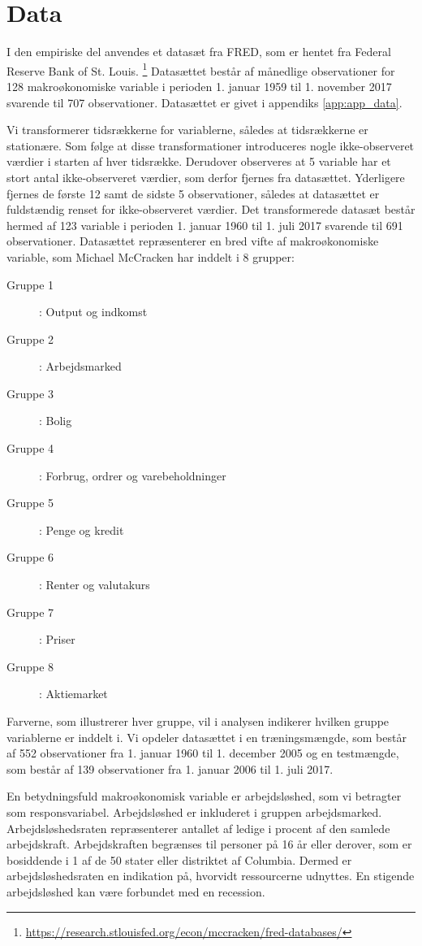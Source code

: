 \chapter{Data} \label{ch:data}
I den empiriske del anvendes et datasæt fra FRED, som er hentet fra Federal Reserve Bank of St. Louis. \footnote{\url{https://research.stlouisfed.org/econ/mccracken/fred-databases/}}
Datasættet består af månedlige observationer for 128 makroøkonomiske variable i perioden 1. januar 1959 til 1. november 2017 svarende til 707 observationer.
Datasættet er givet i appendiks \ref{app:app_data}.

Vi transformerer tidsrækkerne for variablerne, således at tidsrækkerne er stationære.
Som følge at disse transformationer introduceres nogle ikke-observeret værdier i starten af hver tidsrække.
Derudover observeres at 5 variable har et stort antal ikke-observeret værdier, som derfor fjernes fra datasættet.
Yderligere fjernes de første 12 samt de sidste 5 observationer, således at datasættet er fuldstændig renset for ikke-observeret værdier.
Det transformerede datasæt består hermed af 123 variable i perioden 1. januar 1960 til 1. juli 2017 svarende til 691 observationer.
Datasættet repræsenterer en bred vifte af makroøkonomiske variable, som Michael McCracken har inddelt i 8 grupper:
%
\begin{description}
\item [Gruppe 1]: Output og indkomst 
\item [Gruppe 2]: Arbejdsmarked 
\item [Gruppe 3]: Bolig 
\item [Gruppe 4]: Forbrug, ordrer og varebeholdninger  
\item [Gruppe 5]: Penge og kredit 
\item [Gruppe 6]: Renter og valutakurs 
\item [Gruppe 7]: Priser 
\item [Gruppe 8]: Aktiemarket 
\end{description} 
%
Farverne, som illustrerer hver gruppe, vil i analysen indikerer hvilken gruppe variablerne er inddelt i.
Vi opdeler datasættet i en træningsmængde, som består af 552 observationer fra 1. januar 1960 til 1. december 2005 og en testmængde, som består af 139 observationer fra 1. januar 2006 til 1. juli 2017. 

En betydningsfuld makroøkonomisk variable er arbejdsløshed, som vi betragter som responsvariabel.  
Arbejdsløshed er inkluderet i gruppen arbejdsmarked.
Arbejdsløshedsraten repræsenterer antallet af ledige i procent af den samlede arbejdskraft.
Arbejdskraften begrænses til personer på 16 år eller derover, som er bosiddende i 1 af de 50 stater eller distriktet af Columbia.
Dermed er arbejdsløshedsraten en indikation på, hvorvidt ressourcerne udnyttes.
En stigende arbejdsløshed kan være forbundet med en recession.

